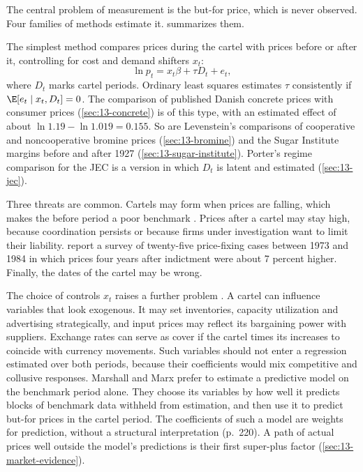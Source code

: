 The central problem of measurement is the but-for price, which is never observed. Four families of methods
estimate it.  summarizes them.

The simplest method compares prices during the cartel with prices before or after it, controlling for cost and
demand shifters $x_t$:
\begin{equation}\label{eq:13-bda}
  \ln p_t = x_t\beta + \tau D_t + e_t ,
\end{equation}
where $D_t$ marks cartel periods. Ordinary least squares estimates $\tau$ consistently if $\E[e_t \mid x_t, D_t] = 0$.
The comparison of published Danish concrete prices with consumer prices (\cref{sec:13-concrete}) is of this type, with
an estimated effect of about $\ln 1.19 - \ln 1.019 = 0.155$. So are Levenstein's comparisons of cooperative and
noncooperative bromine prices (\cref{sec:13-bromine}) and the Sugar Institute margins before and after 1927
(\cref{sec:13-sugar-institute}). Porter's regime comparison for the JEC is a version in which $D_t$ is latent and
estimated (\cref{sec:13-jec}).

Three threats are common. Cartels may form when prices are falling, which makes the before period a poor benchmark
\citep[p.~45]{LevensteinSuslow2006}. Prices after a cartel may stay high, because coordination persists or because
firms under investigation want to limit their liability. \citet[pp.~80--81]{LevensteinSuslow2006} report a survey of
twenty-five price-fixing cases between 1973 and 1984 in which prices four years after indictment were about 7
percent higher. Finally, the dates of the cartel may be wrong.

The choice of controls $x_t$ raises a further problem \citep[pp.~215--220]{MarshallMarx2012}. A cartel can
influence variables that look exogenous. It may set inventories, capacity utilization and advertising
strategically, and input prices may reflect its bargaining power with suppliers. Exchange rates can serve as cover
if the cartel times its increases to coincide with currency movements. Such variables should not enter a
regression estimated over both periods, because their coefficients would mix competitive and collusive responses.
Marshall and Marx prefer to estimate a predictive model on the benchmark period alone. They choose its variables by
how well it predicts blocks of benchmark data withheld from estimation, and then use it to predict but-for prices
in the cartel period. The coefficients of such a model are weights for prediction, without a structural
interpretation (p.~220). A path of actual prices well outside the model's predictions is their first super-plus
factor (\cref{sec:13-market-evidence}).

